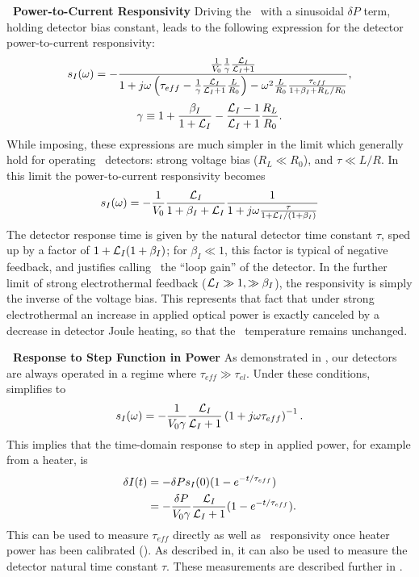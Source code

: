 \textbf{\TES\ Power-to-Current Responsivity}
Driving the \TES\ with a sinusoidal $\delta P$ term, holding detector bias constant, leads to the following expression for the detector power-to-current responsivity:
\begin{equation}\label{eqn:si-full}
s_I(\omega) = 
- \frac{ \frac{1}{V_0} \frac{1}{\gamma} \frac{\mathcal{L}_I}{\mathcal{L}_I + 1} }
       { 1 + j \omega \left( \tau_{eff} - \frac{1}{\gamma}\frac{\mathcal{L}_I}{\mathcal{L}_I + 1} \frac{L}{R_0}\right) - \omega^2 \frac{L}{R_0}\frac{\tau_{eff}}{1 + \beta_I + R_L / R_0}},
\end{equation}
\begin{equation}
\gamma \equiv 1 + \frac{\beta_I}{1+\mathcal{L}_I} - \frac{\mathcal{L}_I - 1}{\mathcal{L}_I + 1}\frac{R_L}{R_0}.
\end{equation}
While imposing, these expressions are much simpler in the limit which generally hold for operating \TES\ detectors: strong voltage bias ($R_L \ll R_0$), and $\tau \ll L/R$. 
In this limit the power-to-current responsivity becomes
\begin{equation}
s_I(\omega) = -\frac{1}{V_0} \frac{\mathcal{L}_I}{1+\beta_I + \mathcal{L}_I} \frac{1}{1 + j \omega \frac{\tau}{1 +\mathcal{L}_I/(1+\beta_I)}}
\end{equation}
The detector response time is given by the natural detector time constant $\tau$, sped up by a factor of $1 + \mathcal{L}_I(1+\beta_I)$; for $\beta_I \ll 1$, this factor is typical of negative feedback, and justifies calling \Loop\ the ``loop gain'' of the detector.
In the further limit of strong electrothermal feedback ($\mathcal{L}_I \gg 1, \gg \beta_I$), the \DC responsivity is simply the inverse of the voltage bias.
This represents that fact that under strong electrothermal an increase in applied optical power is exactly canceled by a decrease in detector Joule heating, so that the \TES\ temperature remains unchanged.

\textbf{\TES\ Response to Step Function in Power}
As demonstrated in , our detectors are always operated in a regime where $\tau_{eff} \gg \tau_{el}$.
Under these conditions,  simplifies to
\begin{equation} \label{eqn:htr-step-resp-high}
s_I(\omega) = - \frac{1}{V_0 \gamma}\frac{\mathcal{L}_I}{\mathcal{L}_I + 1}
                       \left(1 + j \omega \tau_{eff}\right)^{-1}.
\end{equation}
This implies that the time-domain response to step in applied power, for example from a heater, is
\begin{equation} \label{eqn:htr-step-resp-high-time}
  \begin{split}
    \delta I(t) & = - \delta P s_I(0) (1 - e^{-t/\tau_{eff}}) \\
                & = - \frac{\delta P}{V_0 \gamma}\frac{\mathcal{L}_I}{\mathcal{L}_I + 1}
                      (1 - e^{-t/\tau_{eff}}).
  \end{split}
\end{equation}
This can be used to measure $\tau_{eff}$ directly as well as \DC\ responsivity once heater power has been calibrated ().
As described in, it can also be used to measure the detector natural time constant $\tau$.
These measurements are described further in .

